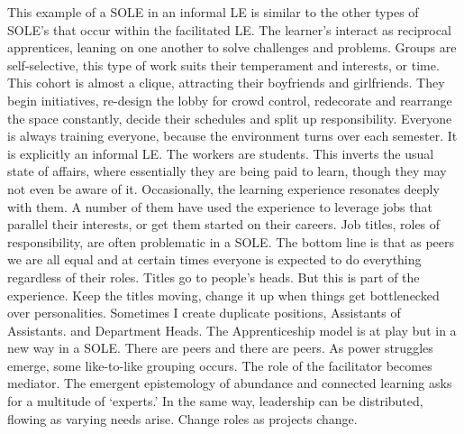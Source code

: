 This example of a SOLE in an informal LE is similar to the other types
of SOLE's that occur within the facilitated LE. The learner's interact
as reciprocal apprentices, leaning on one another to solve challenges
and problems. Groups are self-selective, this type of work suits their
temperament and interests, or time. This cohort is almost a clique,
attracting their boyfriends and girlfriends. They begin initiatives,
re-design the lobby for crowd control, redecorate and rearrange the
space constantly, decide their schedules and split up responsibility.
Everyone is always training everyone, because the environment turns over
each semester. It is explicitly an informal LE. The workers are
students. This inverts the usual state of affairs, where essentially
they are being paid to learn, though they may not even be aware of it.
Occasionally, the learning experience resonates deeply with them. A
number of them have used the experience to leverage jobs that parallel
their interests, or get them started on their careers. Job titles, roles
of responsibility, are often problematic in a SOLE. The bottom line is
that as peers we are all equal and at certain times everyone is expected
to do everything regardless of their roles. Titles go to people's heads.
But this is part of the experience. Keep the titles moving, change it up
when things get bottlenecked over personalities. Sometimes I create
duplicate positions, Assistants of Assistants. and Department Heads. The
Apprenticeship model is at play but in a new way in a SOLE. There are
peers and there are peers. As power struggles emerge, some like-to-like
grouping occurs. The role of the facilitator becomes mediator. The
emergent epistemology of abundance and connected learning asks for a
multitude of `experts.' In the same way, leadership can be distributed,
flowing as varying needs arise. Change roles as projects change.

